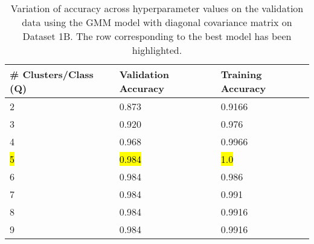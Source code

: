 \begin{table}[H]
\centering
\begin{tabular}{l l l}
\hline
\hline
\textbf{\# Clusters/Class (Q)} &  \textbf{Validation Accuracy} &  \textbf{Training Accuracy}  \\
\hline
\hline
2 & 0.873 & 0.9166\\
3 & 0.920 & 0.976\\
4 & 0.968 & 0.9966\\
\hl{5} & \hl{0.984} & \hl{1.0}\\
6 & 0.984 & 0.986\\
7 & 0.984 & 0.991\\
8 & 0.984 & 0.9916\\
9 & 0.984 & 0.9916\\
\hline
\end{tabular}
\caption{Variation of accuracy across hyperparameter values on the validation data using the GMM model with diagonal covariance matrix on Dataset 1B. The row corresponding to the best model has been highlighted.}
\label{tab:cv1b}
\end{table}


